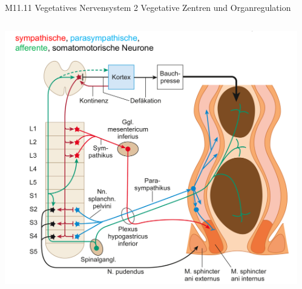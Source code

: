 \documentclass{beamer}
\begin{document}
\begin{frame}{M11.11 Vegetatives Nervensystem 2 Vegetative Zentren und Organregulation}

\begin{columns}[c]
\begin{column}{5cm}
    



\begin{center}
\includegraphics[width=\textwidth]{defecation.png}    
\end{center}

\end{column}

\begin{column}{5cm}

\pause


\end{column}
\end{columns}
\end{frame}
\end{document}
